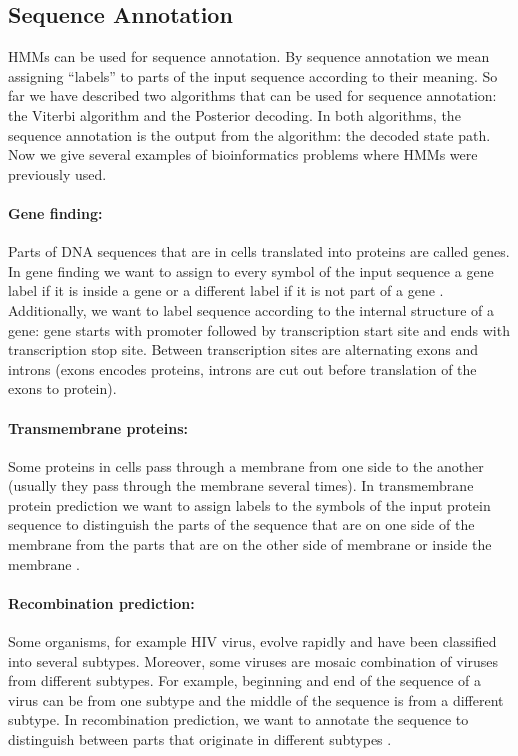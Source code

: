 \subsection{Sequence Annotation}


HMMs can be used for sequence annotation. By sequence annotation we mean
assigning ``labels'' to parts of the input sequence according to their meaning.
So far we have described two algorithms that can be used for sequence
annotation: the Viterbi algorithm and the Posterior decoding. In both
algorithms, the sequence annotation is the output from the algorithm: the
decoded state path. Now we give several examples of bioinformatics problems
where HMMs were previously used. 

\paragraph{Gene finding:} Parts of DNA sequences that are in cells translated
into proteins are called genes.  In gene finding we want to assign to every
symbol of the input sequence a gene label if it is inside a gene or a different
label if it is not part of a gene \cite{GeneWise2004, Brejova2005, Burge1997,
Alexanderson2004}. Additionally, we want to label sequence according to the
internal structure of a gene: gene starts with promoter followed by
transcription start site and ends with transcription stop site. Between
transcription sites are alternating exons and introns \cite{GeneWise2004,
Brejova2005, Burge1997, Alexanderson2004} (exons encodes proteins, introns are
cut out before translation of the exons to protein). 


\paragraph{Transmembrane proteins:} Some proteins in cells pass through a membrane
from one side to the another (usually they pass through the membrane several times).  In
transmembrane protein prediction we want to assign labels to the symbols of the input
protein sequence to distinguish the parts of the sequence that are on one side of the
membrane from the parts that are on the other side of membrane or inside the membrane
\cite{Brown2010}.

\paragraph{Recombination prediction:} Some organisms, for example HIV virus,
evolve rapidly and have been classified into several subtypes.  Moreover,
some viruses are mosaic combination of viruses from different subtypes. For
example, beginning and end of the sequence of a virus can be from one subtype and
the middle of the sequence is from a different subtype. In recombination prediction,
we want to annotate the sequence to distinguish between parts that originate in
different subtypes \cite{Nanasi2010,Truszkowski2011}.  

